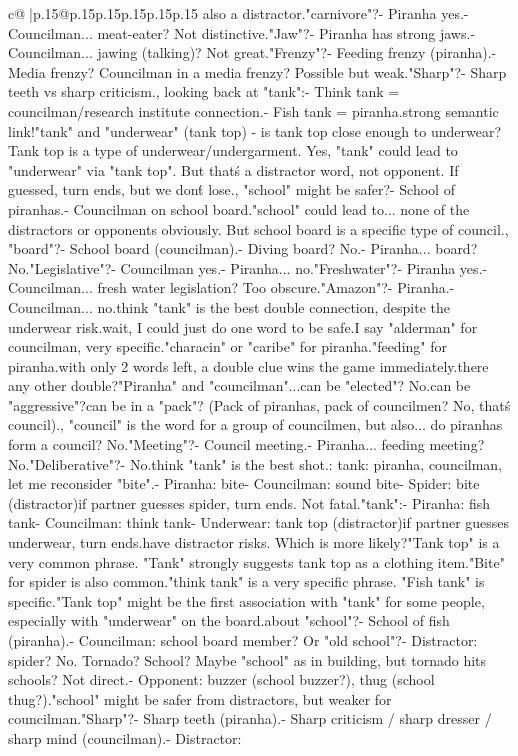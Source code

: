 \documentclass{article}
\begin{document}
{\begin{supertabular}{c@{$\;$}|p{.15\linewidth}@{}p{.15\linewidth}p{.15\linewidth}p{.15\linewidth}p{.15\linewidth}p{.15\linewidth}}
{{{also a distractor.\n\n"carnivore"?\n- Piranha yes.\n- Councilman... meat-eater? Not distinctive.\n\n"Jaw"?\n- Piranha has strong jaws.\n- Councilman... jawing (talking)? Not great.\n\n"Frenzy"?\n- Feeding frenzy (piranha).\n- Media frenzy? Councilman in a media frenzy? Possible but weak.\n\n"Sharp"?\n- Sharp teeth vs sharp criticism.\n\nActually, looking back at "tank":\n- Think tank = councilman/research institute connection.\n- Fish tank = piranha.\nVery strong semantic link!\n\nBut "tank" and "underwear" (tank top) - is tank top close enough to underwear? Tank top is a type of underwear/undergarment. Yes, "tank" could lead to "underwear" via "tank top". But that\'s a distractor word, not opponent. If guessed, turn ends, but we don\'t lose.\n\nHowever, "school" might be safer?\n- School of piranhas.\n- Councilman on school board.\nBut "school" could lead to... none of the distractors or opponents obviously. But school board is a specific type of council.\n\nActually, "board"?\n- School board (councilman).\n- Diving board? No.\n- Piranha... board? No.\n\n"Legislative"?\n- Councilman yes.\n- Piranha... no.\n\n"Freshwater"?\n- Piranha yes.\n- Councilman... fresh water legislation? Too obscure.\n\n"Amazon"?\n- Piranha.\n- Councilman... no.\n\nI think "tank" is the best double connection, despite the underwear risk.\n\nBut wait, I could just do one word to be safe.\nIf I say "alderman" for councilman, very specific.\nOr "characin" or "caribe" for piranha.\nOr "feeding" for piranha.\n\nBut with only 2 words left, a double clue wins the game immediately.\n\nIs there any other double?\n"Piranha" and "councilman"...\nBoth can be "elected"? No.\nBoth can be "aggressive"?\nBoth can be in a "pack"? (Pack of piranhas, pack of councilmen? No, that\'s council).\n\nActually, "council" is the word for a group of councilmen, but also... do piranhas form a council? No.\n\n"Meeting"?\n- Council meeting.\n- Piranha... feeding meeting? No.\n\n"Deliberative"?\n- No.\n\nI think "tank" is the best shot.\nCLUE: tank\nTARGETS: piranha, councilman\n\nWait, let me reconsider "bite".\n- Piranha: bite\n- Councilman: sound bite\n- Spider: bite (distractor)\nSo if partner guesses spider, turn ends. Not fatal.\n\nWith "tank":\n- Piranha: fish tank\n- Councilman: think tank\n- Underwear: tank top (distractor)\nSo if partner guesses underwear, turn ends.\n\nBoth have distractor risks. Which is more likely?\n"Tank top" is a very common phrase. "Tank" strongly suggests tank top as a clothing item.\n"Bite" for spider is also common.\nBut "think tank" is a very specific phrase. "Fish tank" is specific.\n"Tank top" might be the first association with "tank" for some people, especially with "underwear" on the board.\n\nWhat about "school"?\n- School of fish (piranha).\n- Councilman: school board member? Or "old school"?\n- Distractor: spider? No. Tornado? School? Maybe "school" as in building, but tornado hits schools? Not direct.\n- Opponent: buzzer (school buzzer?), thug (school thug?).\nActually "school" might be safer from distractors, but weaker for councilman.\n\n"Sharp"?\n- Sharp teeth (piranha).\n- Sharp criticism / sharp dresser / sharp mind (councilman).\n- Distractor: }}}
\end{supertabular}}
\end{document}
